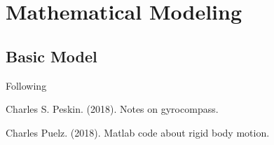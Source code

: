 \documentclass[12pt]{article}
\renewcommand{\(}{\left (}
\renewcommand{\)}{\right )}
\begin{document}
\section{Mathematical Modeling}
\subsection{Basic Model}

\hspace{5mm} Following
\begin{thebibliography}{9}

	Charles S. Peskin. (2018).
	Notes on gyrocompass.

	Charles Puelz. (2018).
	Matlab code about rigid body motion.




\end{thebibliography}
\end{document}
